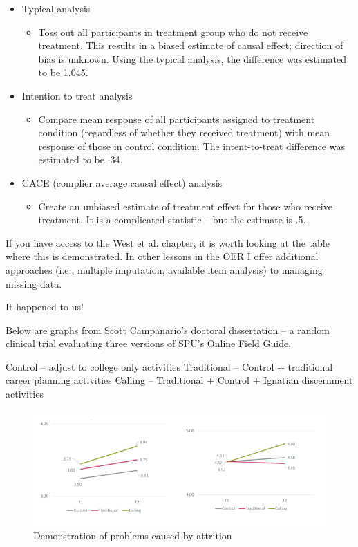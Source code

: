 \documentclass[
  english,
]{book}
\providecommand{\tightlist}{%
  \setlength{\itemsep}{0pt}\setlength{\parskip}{0pt}}
\begin{document}
\begin{itemize}
\tightlist
\item
  Typical analysis

  \begin{itemize}
  \tightlist
  \item
    Toss out all participants in treatment group who do not receive treatment. This results in a biased estimate of causal effect; direction of bias is unknown. Using the typical analysis, the difference was estimated to be 1.045.
  \end{itemize}
\item
  Intention to treat analysis

  \begin{itemize}
  \tightlist
  \item
    Compare mean response of all participants assigned to treatment condition (regardless of whether they received treatment) with mean response of those in control condition. The intent-to-treat difference was estimated to be .34.
  \end{itemize}
\item
  CACE (complier average causal effect) analysis

  \begin{itemize}
  \tightlist
  \item
    Create an unbiased estimate of treatment effect for those who receive treatment. It is a complicated statistic -- but the estimate is .5.
  \end{itemize}
\end{itemize}

If you have access to the West et al. \citeyearpar{reis_causal_2000} chapter, it is worth looking at the table where this is demonstrated. In other lessons in the OER I offer additional approaches (i.e., multiple imputation, available item analysis) to managing missing data.

It happened to us!

Below are graphs from Scott Campanario's doctoral dissertation \citep{campanario_ignatian_2018, campanario_ignatian_2020} -- a random clinical trial evaluating three versions of SPU's Online Field Guide.

Control -- adjust to college only activities
Traditional -- Control + traditional career planning activities
Calling -- Traditional + Control + Ignatian discernment activities

\begin{figure}
\centering
\includegraphics{images/Experiment/Campanario.png}
\caption{Demonstration of problems caused by attrition}
\end{figure}
\end{document}
